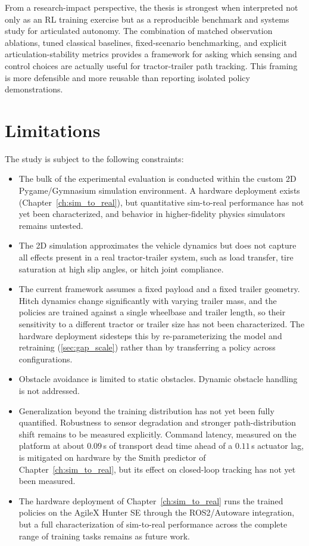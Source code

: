 From a research-impact perspective, the thesis is strongest when interpreted not only as an RL training exercise but as a reproducible benchmark and systems study for articulated autonomy. The combination of matched observation ablations, tuned classical baselines, fixed-scenario benchmarking, and explicit articulation-stability metrics provides a framework for asking which sensing and control choices are actually useful for tractor-trailer path tracking. This framing is more defensible and more reusable than reporting isolated policy demonstrations.

\section{Limitations}

The study is subject to the following constraints:
\begin{itemize}
    \item The bulk of the experimental evaluation is conducted within the custom 2D Pygame/Gymnasium simulation environment. A hardware deployment exists (Chapter~\ref{ch:sim_to_real}), but quantitative sim-to-real performance has not yet been characterized, and behavior in higher-fidelity physics simulators remains untested.
    \item The 2D simulation approximates the vehicle dynamics but does not capture all effects present in a real tractor-trailer system, such as load transfer, tire saturation at high slip angles, or hitch joint compliance.
    \item The current framework assumes a fixed payload and a fixed trailer geometry. Hitch dynamics change significantly with varying trailer mass, and the policies are trained against a single wheelbase and trailer length, so their sensitivity to a different tractor or trailer size has not been characterized. The hardware deployment sidesteps this by re-parameterizing the model and retraining (\cref{sec:gap_scale}) rather than by transferring a policy across configurations.
    \item Obstacle avoidance is limited to static obstacles. Dynamic obstacle handling is not addressed.
    \item Generalization beyond the training distribution has not yet been fully quantified. Robustness to sensor degradation and stronger path-distribution shift remains to be measured explicitly. Command latency, measured on the platform at about $0.09$\,s of transport dead time ahead of a $0.11$\,s actuator lag, is mitigated on hardware by the Smith predictor of Chapter~\ref{ch:sim_to_real}, but its effect on closed-loop tracking has not yet been measured.
    \item The hardware deployment of Chapter~\ref{ch:sim_to_real} runs the trained policies on the AgileX Hunter SE through the ROS2/Autoware integration, but a full characterization of sim-to-real performance across the complete range of training tasks remains as future work.
\end{itemize}

